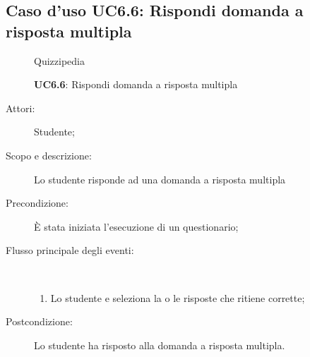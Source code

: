 \subsection{Caso d'uso UC6.6: Rispondi domanda a risposta multipla}
	\begin{figure}[H]
		\centering
		\begin{resizedtikzpicture}{\textwidth}
		\begin{umlsystem}[x=0, fill=lightgray!20]{Quizzipedia}
		\end{umlsystem}
		\end{resizedtikzpicture}
		\caption{\textbf{UC6.6}: Rispondi domanda a risposta multipla}
		\label{UC6.6}
	\end{figure}
\begin{description}
\item[Attori:] Studente;
\item[Scopo e descrizione:] Lo studente risponde ad una domanda a risposta multipla
      \item[Precondizione:] È stata iniziata l'esecuzione di un questionario;

        \item[Flusso principale degli eventi:] \ 
 \begin{enumerate}
          \item Lo studente e seleziona la o le risposte che ritiene corrette;

      \end{enumerate}
    \item[Postcondizione:] Lo studente ha risposto alla domanda a risposta multipla.
  \end{description}
\hypertarget{UC6.7}{}
